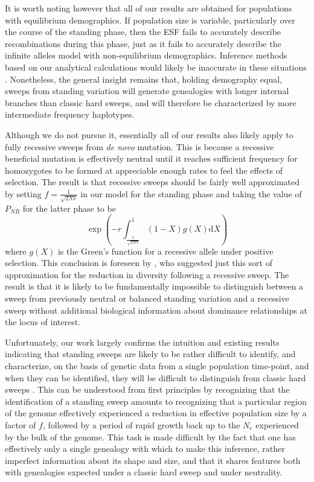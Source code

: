 \documentclass[a4paper,10pt]{article}
\begin{document}
It is worth noting however that all of our results are obtained for populations with equilibrium demographics. If population size is variable, particularly over the course of the standing phase, then the ESF fails to accurately describe recombinations during this phase, just as it fails to accurately describe the infinite alleles model with non-equilibrium demographics. Inference methods based on our analytical calculations would likely be inaccurate in these situations \citep{Bank:2014hx}. Nonetheless, the general insight remains that, holding demography equal, sweeps from standing variation will generate genealogies with longer internal branches than classic hard sweeps, and will therefore be characterized by more intermediate frequency haplotypes. 

Although we do not pursue it, essentially all of our results also likely apply to fully recessive sweeps from \textit{de novo} mutation. This is because a recessive beneficial mutation is effectively neutral until it reaches sufficient frequency for homozygotes to be formed at appreciable enough rates to feel the effects of selection. The result is that recessive sweeps should be fairly well approximated by setting $f = \frac{1}{\sqrt{2Ns}}$ in our model for the standing phase and taking the value of $P_{NR}$ for the latter phase to be
\begin{equation}
	\exp\left(-r \int_{\frac{1}{\sqrt{2Ns}}}^1\left(1-X\right)g\left(X\right)\mathrm{d}X\right)
\end{equation}
where $g\left(X\right)$ is the Green's function for a recessive allele under positive selection. This conclusion is foreseen by \cite{Ewing:2010bg}, who suggested just this sort of approximation for the reduction in diversity following a recessive sweep. The result is that it is likely to be fundamentally impossible to distinguish between a sweep from previously neutral or balanced standing variation and a recessive sweep without additional biological information about dominance relationships at the locus of interest.

Unfortunately, our work largely confirms the intuition and existing results indicating that standing sweeps are likely to be rather difficult to identify, and characterize, on the basis of genetic data from a single population time-point, and when they can be identified, they will be difficult to distinguish from classic hard sweeps \citep{Peter:2012ht}. This can be understood from first principles by recognizing that the identification of a standing sweep amounts to recognizing that a particular region of the genome effectively experienced a reduction in effective population size by a factor of $f$, followed by a period of rapid growth back up to the $N_e$ experienced by the bulk of the genome. This task is made difficult by the fact that one has effectively only a single genealogy with which to make this inference, rather imperfect information about its shape and size, and that it shares features both with genealogies expected under a classic hard sweep and under neutrality.
\end{document}
